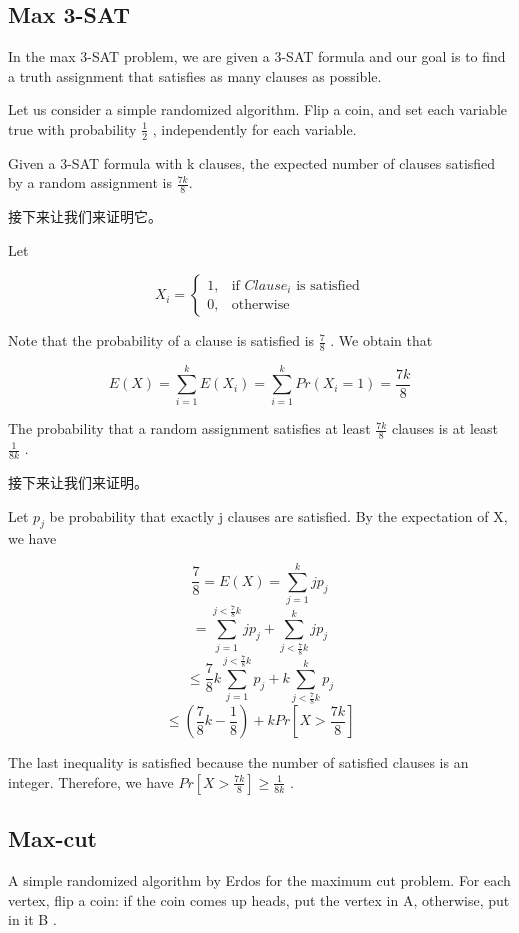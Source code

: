\documentclass{article}
\begin{document}
\subsection{Max 3-SAT}

In the max 3-SAT problem, we are given a 3-SAT formula and our goal is to find a truth assignment that satisfies as many clauses as possible.

Let us consider a simple randomized algorithm. Flip a coin, and set each variable true with probability $\frac{1}{2}$ , independently for each variable.

Given a 3-SAT formula with k clauses, the expected number of clauses satisfied by a random assignment is $\frac{7k}{8}$.

接下来让我们来证明它。

Let 

$$X_i = \begin{cases} 1,& \text{if } Clause_i \text{ is satisfied}\\ 0,& \text{otherwise}\end{cases}$$

Note that the probability of a clause is satisfied is $\frac{7}{8}$ . We obtain that

$$E(X) = \sum\limits_{i=1}^kE(X_i) = \sum\limits_{i=1}^k Pr(X_i=1) = \frac{7k}{8}$$

The probability that a random assignment satisfies at least $\frac{7k}{8}$ clauses is at least $\frac{1}{8k}$ .

接下来让我们来证明。

Let $p_j$ be probability that exactly j clauses are satisfied. By the expectation of X, we have

$$\frac{7}{8} = E(X) = \sum\limits_{j=1}^kjp_j$$
$$ = \sum\limits_{j=1}^{j < \frac{7}{8}k}jp_j + \sum\limits_{j < \frac{7}{8}k}^k jp_j$$
$$\le \frac{7}{8}k \sum\limits_{j=1}^{j < \frac{7}{8}k}p_j + k \sum\limits_{j< \frac{7}{8}k}^k p_j$$
$$\le (\frac{7}{8}k - \frac{1}{8}) + k Pr[X > \frac{7k}{8}]$$

The last inequality is satisfied because the number of satisfied clauses is an integer. Therefore, we have $Pr[X > \frac{7k}{8}] \ge \frac{1}{8k}$ .

\subsection{Max-cut}
A simple randomized algorithm by Erdos for the maximum cut problem. For each vertex, flip a coin: if the coin comes up heads, put the vertex in A, otherwise, put in it B .
\end{document}
